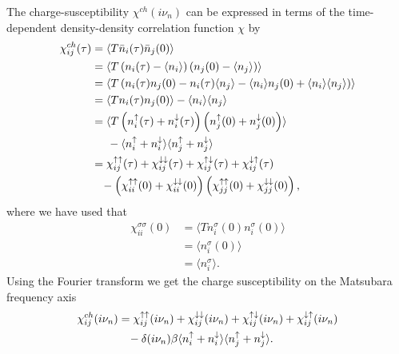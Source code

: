 \documentclass[12pt,a4paper]{scrartcl}
\numberwithin{equation}{section}
\begin{document}
The charge-susceptibility $\chi^{ch}(i\nu_n)$ can be expressed in terms of
the time-dependent density-density correlation function $\chi$ by
\begin{align}
 \chi^{ch}_{ij}(\tau) 
 &= \langle T \bar{n}_i(\tau) \bar{n}_j(0) \rangle \\
 &= \langle T \left( n_i(\tau)-\langle n_i \rangle \right) 
              \left( n_j(0)-\langle n_j \rangle \right)\rangle \\
 &= \langle T \left( n_i(\tau)n_j(0) - n_i(\tau)\langle n_j \rangle
                                     - \langle n_i \rangle n_j(0)
                                     + \langle n_i \rangle\langle n_j \rangle
              \right)\rangle \\ 
 &= \langle T n_i(\tau)n_j(0) \rangle - \langle n_i \rangle\langle n_j \rangle \\
 &= \langle T \left( n^{\uparrow}_i(\tau)+n^{\downarrow}_i(\tau) \right)
              \left( n^{\uparrow}_j(0)+n^{\downarrow}_j(0) \right)\rangle  \nonumber \\
 & \hspace{0.5cm}  -\langle n^{\uparrow}_i+n^{\downarrow}_i  \rangle\langle n^{\uparrow}_j+n^{\downarrow}_j  \rangle \\
 &=  \chi_{ij}^{\uparrow\uparrow}(\tau) + \chi_{ij}^{\downarrow\downarrow}(\tau) 
    +\chi_{ij}^{\uparrow\downarrow}(\tau)  +\chi_{ij}^{\downarrow\uparrow}(\tau)  \nonumber \\
 & \hspace{0.3cm} - \left( \chi_{ii}^{\uparrow\uparrow}(0)+\chi_{ii}^{\downarrow\downarrow}(0)  \right)
                    \left( \chi_{jj}^{\uparrow\uparrow}(0)+\chi_{jj}^{\downarrow\downarrow}(0)  \right),
 \end{align}
 where we have used that 
 \begin{align}
  \chi_{ii}^{\sigma\sigma}(0) 
  &= \langle T n^{\sigma}_i(0) n^{\sigma}_i(0) \rangle \\
  &= \langle  n^{\sigma}_i(0) \rangle \\
  &= \langle n^{\sigma}_i \rangle.
 \end{align}
Using the Fourier transform we get the charge susceptibility on the Matsubara
frequency axis
\begin{align}
 \chi^{ch}_{ij}(i\nu_n) 
 &=   \chi_{ij}^{\uparrow\uparrow}(i\nu_n) + \chi_{ij}^{\downarrow\downarrow}(i\nu_n) 
    +\chi_{ij}^{\uparrow\downarrow}(i\nu_n)  +\chi_{ij}^{\downarrow\uparrow}(i\nu_n) \nonumber \\
 & \hspace{0.3cm} - \delta(i\nu_n) \beta \langle n^{\uparrow}_i+n^{\downarrow}_i  \rangle\langle n^{\uparrow}_j+n^{\downarrow}_j  \rangle.
\end{align}
\end{document}
